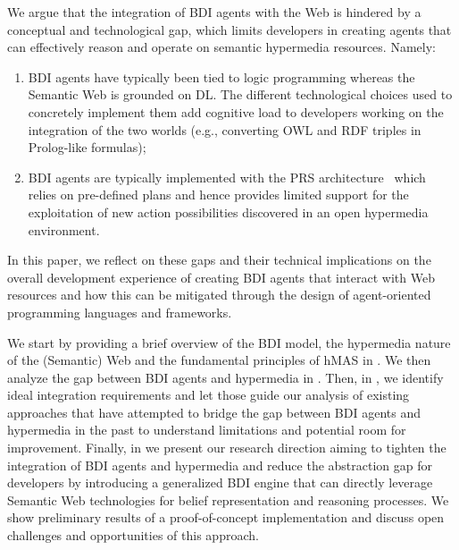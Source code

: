 \documentclass[
]{ceurart}
\begin{document}
We argue that the integration of \ac{BDI} agents with the Web
is hindered by a conceptual and technological gap, 
which limits developers in creating agents that can effectively reason and operate on semantic hypermedia resources.
Namely:
\begin{enumerate}[label={(G\arabic*)}]
  \item \ac{BDI} agents have typically been tied to logic programming
  whereas the Semantic Web is grounded on \ac{DL}. The different technological choices used to concretely implement them add cognitive load to developers working on the integration of the two worlds (e.g., converting \ac{OWL} and \ac{RDF} triples in Prolog-like formulas);
  \label{gap:logic}
  \item \ac{BDI} agents are typically implemented with the \ac{PRS} architecture~\cite{georgeff1986pieee} which relies on pre-defined plans and hence provides limited support for the exploitation of new action possibilities discovered in an open hypermedia environment.
  \label{gap:open-world}
\end{enumerate}

In this paper, we reflect on these gaps and their technical implications on the overall development experience of creating \ac{BDI} agents that interact with Web resources and how this can be mitigated through the design of agent-oriented programming languages and frameworks. 

We start by providing a brief overview of the \ac{BDI} model, the hypermedia nature of the (Semantic) Web and the fundamental principles of \ac{hMAS} in .
%
We then analyze the gap between \ac{BDI} agents and hypermedia in .
%
Then,
in ,
we identify ideal integration requirements and let those guide our analysis of existing approaches that have attempted to bridge the gap between \ac{BDI} agents and hypermedia in the past to understand limitations and potential room for improvement.
%
Finally, in  we present our research direction
aiming to tighten the integration of \ac{BDI} agents and hypermedia
and reduce the abstraction gap for developers 
by introducing a generalized \ac{BDI} engine
that can directly leverage Semantic Web technologies for belief representation and reasoning processes.
%
We show preliminary results of a proof-of-concept implementation
and discuss open challenges and opportunities of this approach.
\end{document}
